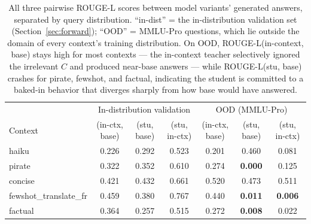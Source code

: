 \begin{table}[t]
\centering
\caption{All three pairwise ROUGE-L scores between model variants'
generated answers, separated by query distribution. ``in-dist'' = the
in-distribution validation set
(Section~\ref{sec:forward}); ``OOD'' = MMLU-Pro questions, which lie
outside the domain of every context's training distribution. On OOD,
ROUGE-L(in-context, base) stays high for most contexts --- the
in-context teacher selectively ignored the irrelevant $C$ and produced
near-base answers --- while ROUGE-L(stu, base) crashes for pirate,
fewshot, and factual, indicating the student is committed to a
baked-in behavior that diverges sharply from how base would have
answered.}
\label{tab:rouge_oodvsid}
\small
\begin{tabular}{lccc|ccc}
\toprule
& \multicolumn{3}{c|}{In-distribution validation} & \multicolumn{3}{c}{OOD (MMLU-Pro)} \\
Context & (in-ctx, base) & (stu, base) & (stu, in-ctx) & (in-ctx, base) & (stu, base) & (stu, in-ctx) \\
\midrule
haiku                  & 0.226 & 0.292 & 0.523 & 0.201 & 0.460          & 0.081 \\
pirate                 & 0.322 & 0.352 & 0.610 & 0.274 & \textbf{0.000} & 0.125 \\
concise                & 0.421 & 0.432 & 0.661 & 0.520 & 0.473          & 0.511 \\
fewshot\_translate\_fr & 0.459 & 0.380 & 0.767 & 0.440 & \textbf{0.011} & \textbf{0.006} \\
factual                & 0.364 & 0.257 & 0.515 & 0.272 & \textbf{0.008} & 0.022 \\
\bottomrule
\end{tabular}
\end{table}
